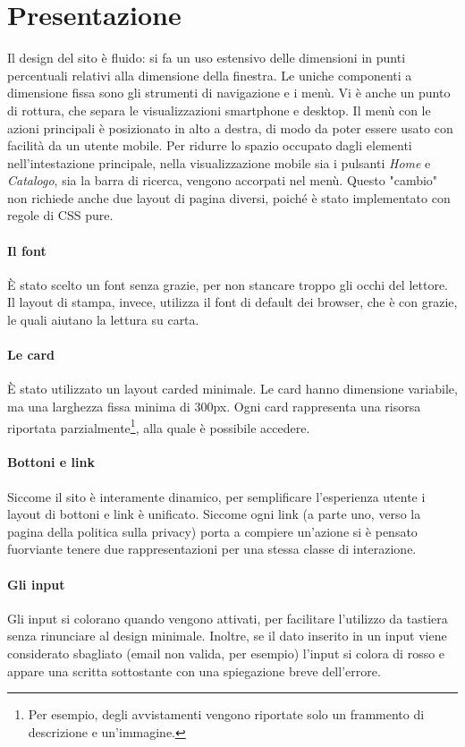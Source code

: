 \documentclass[12pt, a4paper]{article}
\begin{document}
\section{Presentazione}
Il design del sito è fluido: si fa un uso estensivo delle dimensioni in punti percentuali relativi alla dimensione della finestra. Le uniche componenti a dimensione fissa sono gli strumenti di navigazione e i menù. Vi è anche un punto di rottura, che separa le visualizzazioni smartphone e desktop. 
Il menù con le azioni principali è posizionato in alto a destra, di modo da poter essere usato con facilità da un utente mobile. Per ridurre lo spazio occupato dagli elementi nell'intestazione principale, nella visualizzazione mobile sia i pulsanti \textit{Home} e \textit{Catalogo}, sia la barra di ricerca, vengono accorpati nel menù. Questo "cambio" non richiede anche due layout di pagina diversi, poiché è stato implementato con regole di CSS pure. 
\paragraph{Il font} È stato scelto un font senza grazie, per non stancare troppo gli occhi del lettore. Il layout di stampa, invece, utilizza il font di default dei browser, che è con grazie, le quali aiutano la lettura su carta.
\paragraph{Le card} È stato utilizzato un layout carded minimale. Le card hanno dimensione variabile, ma una larghezza fissa minima di 300px. Ogni card rappresenta una risorsa riportata parzialmente\footnote{Per esempio, degli avvistamenti vengono riportate solo un frammento di descrizione e un'immagine.}, alla quale è possibile accedere.
\paragraph{Bottoni e link} Siccome il sito è interamente dinamico, per semplificare l'esperienza utente i layout di bottoni e link è unificato. Siccome ogni link (a parte uno, verso la pagina della politica sulla privacy) porta a compiere un'azione si è pensato fuorviante tenere due rappresentazioni per una stessa classe di interazione.
\paragraph{Gli input} Gli input si colorano quando vengono attivati, per facilitare l'utilizzo da tastiera senza rinunciare al design minimale. Inoltre, se il dato inserito in un input viene considerato sbagliato (email non valida, per esempio) l'input si colora di rosso e appare una scritta sottostante con una spiegazione breve dell'errore.
\end{document}

